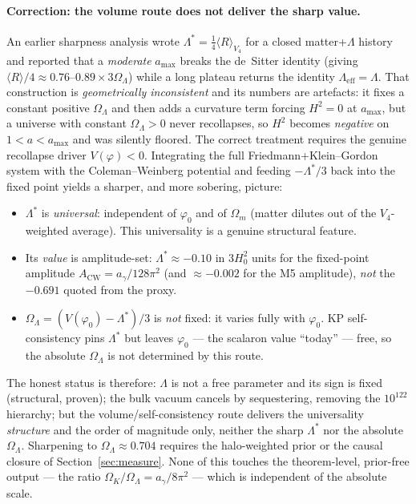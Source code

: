 \documentclass[11pt,a4paper]{article}
\theoremstyle{plain}
\theoremstyle{definition}
\theoremstyle{remark}
\newcommand{\OL}{\Omega_\Lambda}
\newcommand{\ag}{a_\gamma}
\newcommand{\avg}[1]{\langle #1 \rangle}
\begin{document}
\paragraph{Correction: the volume route does not deliver the sharp value.} An earlier
sharpness analysis wrote $\Lambda^* = \tfrac14\avg{R}_{V_4}$ for a closed
matter+$\Lambda$ history and reported that a \emph{moderate} $a_{\max}$ breaks the de~Sitter
identity (giving $\avg{R}/4 \approx 0.76$--$0.89\times 3\OL$) while a long plateau returns the
identity $\Lambda_{\mathrm{eff}}=\Lambda$. That construction is \emph{geometrically
inconsistent} and its numbers are artefacts: it fixes a constant positive $\OL$ and then adds a
curvature term forcing $H^2=0$ at $a_{\max}$, but a universe with constant $\OL>0$ never
recollapses, so $H^2$ becomes \emph{negative} on $1<a<a_{\max}$ and was silently floored. The
correct treatment requires the genuine recollapse driver $V(\varphi)<0$. Integrating the full
Friedmann+Klein--Gordon system with the Coleman--Weinberg potential and feeding $-\Lambda^*/3$
back into the fixed point yields a sharper, and more sobering, picture:
\begin{itemize}
  \item $\Lambda^*$ is \emph{universal}: independent of $\varphi_0$ and of $\Omega_m$ (matter
  dilutes out of the $V_4$-weighted average). This universality is a genuine structural feature.
  \item Its \emph{value} is amplitude-set: $\Lambda^*\approx-0.10$ in $3H_0^2$ units for the
  fixed-point amplitude $A_{\mathrm{CW}}=\ag/128\pi^2$ (and $\approx-0.002$ for the M5 amplitude),
  \emph{not} the $-0.691$ quoted from the proxy.
  \item $\OL = (V(\varphi_0)-\Lambda^*)/3$ is \emph{not} fixed: it varies fully with $\varphi_0$.
  KP self-consistency pins $\Lambda^*$ but leaves $\varphi_0$ --- the scalaron value ``today'' ---
  free, so the absolute $\OL$ is not determined by this route.
\end{itemize}
The honest status is therefore: $\Lambda$ is not a free parameter and its sign is fixed
(structural, proven); the bulk vacuum cancels by sequestering, removing the $10^{122}$ hierarchy;
but the volume/self-consistency route delivers the universality \emph{structure} and the order of
magnitude only, neither the sharp $\Lambda^*$ nor the absolute $\OL$. Sharpening to
$\OL\approx0.704$ requires the halo-weighted prior or the causal closure of
Section~\ref{sec:measure}. None of this touches the theorem-level, prior-free output --- the
ratio $\Omega_K/\OL = \ag/8\pi^2$ --- which is independent of the absolute scale.
\end{document}
